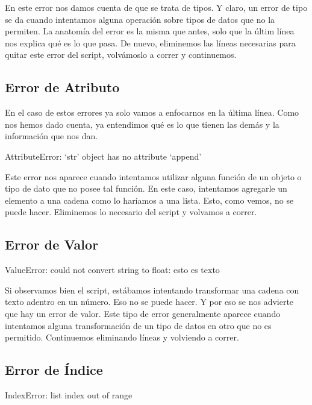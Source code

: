 \documentclass[10pt,letterpaper]{article}
\newenvironment{Code}
{
\begin{lrbox}{\selvestebox}%
\begin{minipage}{\dimexpr\columnwidth-2\fboxsep\relax}
\fontfamily{\ttdefault}\selectfont
}
{\end{minipage}\end{lrbox}%
\begin{center}
\colorbox{light-gray}{\usebox{\selvestebox}}
\end{center}
}
\begin{document}
En este error nos damos cuenta de que se trata de tipos. Y claro, un error de tipo se da cuando intentamos alguna operaci\'on sobre tipos de datos que no la permiten. La anatom\'ia del error es la misma que antes, solo que la \'ultim l\'inea nos explica qu\'e es lo que pasa. De nuevo, eliminemos las l\'ineas necesarias para quitar este error del script, volv\'amoslo a correr y continuemos.

\subsection{Error de Atributo}
En el caso de estos errores ya solo vamos a enfocarnos en la \'ultima l\'inea. Como nos hemos dado cuenta, ya entendimos qu\'e es lo que tienen las dem\'as y la informaci\'on que nos dan.

\begin{Code}
{\color{red} AttributeError: `str' object has no attribute `append'}
\end{Code}

Este error nos aparece cuando intentamos utilizar alguna funci\'on de un objeto o tipo de dato que no posee tal funci\'on. En este caso, intentamos agregarle un elemento a una cadena como lo har\'iamos a una lista. Esto, como vemos, no se puede hacer. Eliminemos lo necesario del script y volvamos a correr.

\subsection{Error de Valor}

\begin{Code}
{\color{red} ValueError: could not convert string to float: esto es texto}
\end{Code}

Si observamos bien el script, est\'abamos intentando transformar una cadena con texto adentro en un n\'umero. Eso no se puede hacer. Y por eso se nos advierte que hay un error de valor. Este tipo de error generalmente aparece cuando intentamos alguna transformaci\'on de un tipo de datos en otro que no es permitido. Continuemos eliminando l\'ineas y volviendo a correr.

\subsection{Error de \'Indice}

\begin{Code}
{\color{red} IndexError: list index out of range}
\end{Code}
\end{document}
